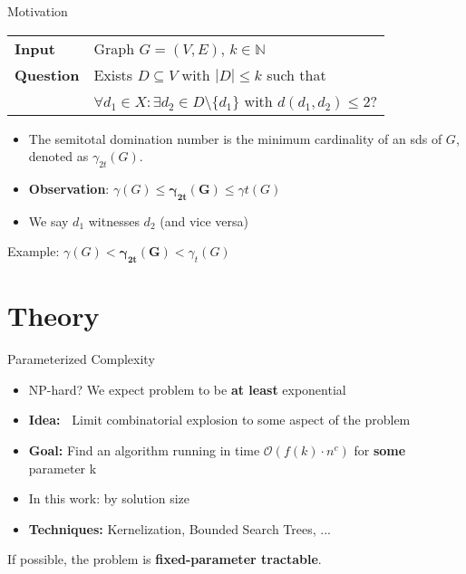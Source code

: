 \begin{frame}[c]{Motivation}
\begin{tcolorbox}[colback=TUMBlueLighter,title=\sdom]
    \begin{tabularx}{1.0\textwidth}{>{\hsize=0.30\hsize}X>{\hsize=0.8\hsize}X}
        \textbf{Input}    & Graph $G = (V, E)$, $k \in \mathbb{N}$\\
        \textbf{Question} & Exists $D \subseteq V$ with $|D| \leq k$ such that  \\
        & $\forall d_1 \in X :\exists d_2 \in D \setminus \{d_1\}$ with ${d(d_1, d_2) \leq 2}$? \\
    \end{tabularx}
\end{tcolorbox}

\begin{itemize}
    \pause \item The semitotal domination number is the minimum cardinality of an sds of $G$, denoted as $\gamma_{2t}(G)$.
    \pause \item \textbf{Observation}: $\gamma(G) \leq  \mathbf{\gamma_{2t}(G)}  \leq \gamma{t}(G)$
    \pause \item We say $d_1$ witnesses $d_2$ (and vice versa)
\end{itemize}
\end{frame}

\begin{frame}[c]{Example: $\gamma(G) < \mathbf{\gamma_{2t}(G)} < \gamma_t(G)$}
\begin{figure}[!ht]
    \end{figure}
\end{frame}

\section{Theory}
\begin{frame}[c]{Parameterized Complexity}
    \begin{itemize}
        \pause \item NP-hard? We expect problem to be  \textbf{at least} exponential \\
        \pause \item \textbf{Idea:~} Limit combinatorial explosion to some aspect of the problem\\
        \pause \item \textbf{Goal: } Find an algorithm running in time $\mathcal{O}(f(k) \cdot n^c)$ for \textbf{some} parameter k
        \pause \item In this work: by solution size
        \pause \item \textbf{Techniques: } Kernelization, Bounded Search Trees, ... 
    \end{itemize}

If possible, the problem is \textbf{fixed-parameter tractable}.

\end{frame}


